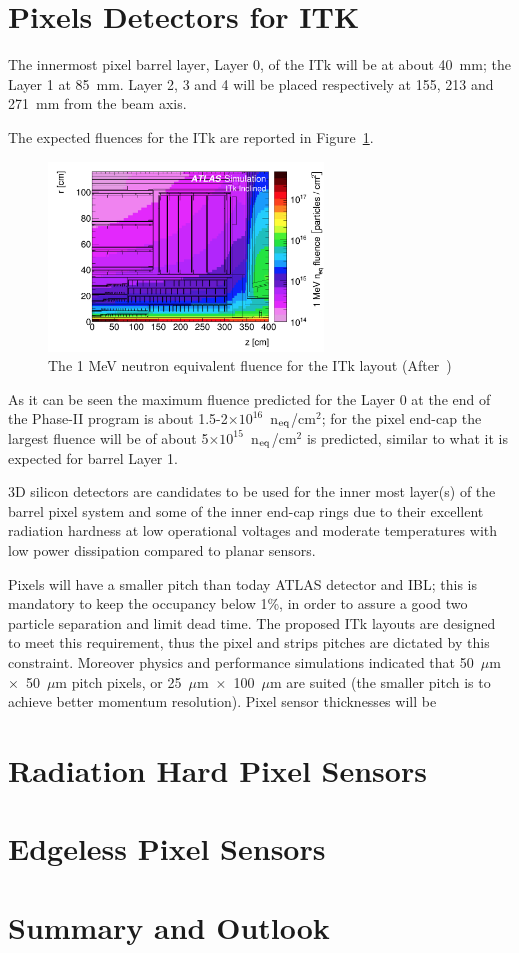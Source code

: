 \section{Pixels Detectors for ITK}
\label{sec:ITkPixels}

The innermost pixel barrel layer, Layer 0, of the ITk will be at about 40~mm; the Layer 1 at 85~mm. 
Layer 2, 3 and 4 will be placed respectively at 155, 213 and 271~mm from the beam axis. 

The expected fluences for the ITk are reported in Figure~\ref{fig:ITk_Fluence}.

\begin{figure}[!htpb]
\centering
\includegraphics[width=0.65\textwidth]{ITk_Fluence.png}
\caption{\label{fig:ITk_Fluence} The 1 MeV neutron equivalent fluence  for the ITk layout 
(After~\cite{ITkStripsTDR})}
\end{figure}

As it can be seen the maximum fluence predicted for the Layer 0 at the end of the Phase-II program is about 1.5-2$\times10^{16}$~n$_{\rm eq}$/cm$^2$; for the pixel end-cap the largest fluence will be  of about 
5$\times10^{15}$~n$_{\rm eq}$/cm$^2$ is predicted, similar to what it is expected for barrel Layer 1.

3D silicon detectors are candidates to be used for the inner most layer(s) of the barrel pixel system and some of the inner end-cap rings due to their excellent radiation hardness at low operational voltages and moderate temperatures with low power dissipation compared to planar sensors.

Pixels will have a smaller pitch than today ATLAS detector and IBL; this is mandatory to keep  the 
occupancy below 1\%, in order to assure a good two particle separation and limit dead time. 
The proposed ITk layouts are designed to meet this requirement, thus the pixel and strips pitches 
are dictated by this constraint. 
Moreover physics and performance simulations indicated that   50~$\mu$m~$\times$~50~$\mu$m pitch 
pixels, or 25~$\mu$m~$\times$~100~$\mu$m are suited (the smaller pitch is to achieve better 
momentum resolution). Pixel sensor thicknesses will be 

\section{Radiation Hard Pixel Sensors}
\label{sec:radhardpixels}



\section{Edgeless Pixel Sensors}
\label{sec:edgeless}

\section{Summary and Outlook}
\label{sec:itksummary}


